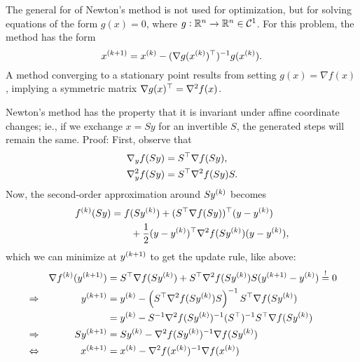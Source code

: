 \documentclass{article}
\begin{document}

The general for of Newton's method is not used for optimization, but for solving equations of the
form \(g(x) = 0\), where \(g: \RR^n \to \RR^n \in \mathcal{C}^1\).  For this problem, the method has
the form
\begin{equation*}
  \kth[k+1]{x} = \kth{x} - (\T{\nabla g(\kth{x})})^{-1} g(\kth{x}).
\end{equation*}
A method converging to a stationary point results from setting \(g(x) = \nabla f(x)\), implying a
symmetric matrix \(\T{\nabla g(x)} = \nabla^2 f(x)\).



Newton's method has the property that it is invariant under affine coordinate changes; ie., if we
exchange \(x = Sy\) for an invertible \(S\), the generated steps will remain the same.  Proof:
First, observe that
\begin{align*}
  \nabla_y f(Sy) &= \T{S} \nabla f(Sy), \\
  \nabla_y^2 f(Sy) &= \T{S} \nabla^2 f(Sy) S.
\end{align*}
Now, the second-order approximation around \(S\kth{y}\) becomes
\begin{align*}
  \kth{f}(Sy) &= f(S\kth{y}) + \T{(\T{S} \nabla f(Sy))}(y - \kth{y}) \\
  &\qquad + \frac{1}{2} \T{(y - \kth{y})} \nabla^2 f(S\kth{y}) (y - \kth{y}),
\end{align*}
which we can minimize at \(\kth[k+1]{y}\) to get the update rule, like above:
\begin{align*}
  & &\nabla \kth{f}(\kth[k+1]{y}) &= \T{S} \nabla f(S\kth{y}) + \T{S} \nabla^2
                                 f(S\kth{y})S(\kth[k+1]{y}
                                 - \kth{y}) \overset{!}{=} 0 \\
  &\Rightarrow & \kth[k+1]{y} &= \kth{y} - \left( \T{S}\nabla^2 f(S\kth{y})S \right)^{-1} \T{S}
                                  \nabla f(S\kth{y}) \\
  &\phantom{\Rightarrow} & &= \kth{y} - S^{-1} \nabla^2 f(S\kth{y})^{-1} (\T{S})^{-1}
                                 \T{S} \nabla f(S\kth{y}) \\
  &\Rightarrow & S\kth[k+1]{y} &= S\kth{y} - \nabla^2 f(S\kth{y})^{-1} \nabla f(S\kth{y}) \\
  &\Leftrightarrow & \kth[k+1]{x} &= \kth{x} - \nabla^2 f(\kth{x})^{-1} \nabla f(\kth{x})
\end{align*}
\end{document}

